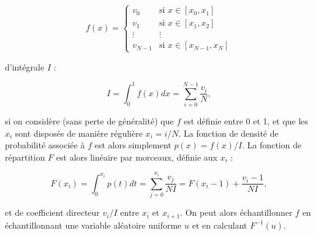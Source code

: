 \begin{equation}
    f(x) = \left\{
        \begin{array}{ll}
            v_0 & \mbox{si } x \in [x_0, x_1] \\
            v_1 & \mbox{si } x \in [x_1, x_2] \\
            \vdots & \vdots \\
            v_{N-1} & \mbox{si } x \in [x_{N-1}, x_N]
        \end{array}
    \right.
\end{equation}

d'intégrale $I$ :

\begin{equation}
    I = \int_{0}^{1} f(x) dx = \sum_{i=0}^{N-1} \frac{v_i}N,
\end{equation}

si on considère (sans perte de généralité) que $f$ est définie entre 0 et 1, et que les $x_i$ sont disposés de manière régulière $x_i = i / N$. La fonction de densité de probabilité associée à $f$ est alors simplement $p(x) = f(x) / I$. La fonction de répartition $F$ est alors linéaire par morceaux, définie aux $x_i$ :

\begin{equation}
    F(x_i) = \int_{0}^{x_i} p(t) dt = \sum_{j=0}^{x_i} \frac{v_j}{NI} = F(x_i-1) + \frac{v_i-1}{NI},
\end{equation}

et de coefficient directeur $v_i/I$ entre $x_i$ et $x_{i+1}$. On peut alors échantillonner $f$ en échantillonnant une variable aléatoire uniforme $u$ et en calculant $F^{-1}(u)$.

\bigskip

%
%
%


